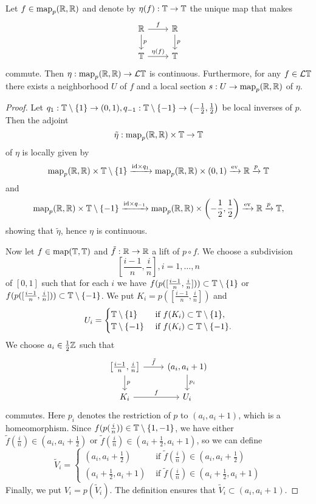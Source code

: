 \begin{prop}\label{prop:loopspacesection}
Let $f\in \mathrm{map}_p(\mathbb{R},\mathbb{R})$ and denote by $\eta(f):\mathbb{T}\to \mathbb{T}$ the unique map
that makes 
$$
\begin{tikzcd}
\RR \arrow{r}{f}\arrow{d}{p}
&\RR\arrow{d}{p}\\
\TT\arrow{r}{\eta(f)}
&\TT
\end{tikzcd}
$$
commute. Then $\eta:\mathrm{map}_p(\mathbb{R},\mathbb{R})\rightarrow \mathcal{L}\mathbb{T}$ is continuous.
Furthermore,  for any $f\in \mathcal{L}\mathbb{T}$ there exists a neighborhood $U$
of $f$ and a local section $s:U\rightarrow \mathrm{map}_p(\mathbb{R},\mathbb{R})$ of $\eta$.
\end{prop}
\begin{proof}
Let $q_1:\mathbb{T}\setminus\{1\}\rightarrow (0,1), q_{-1}:\mathbb{T}\setminus\{-1\}\to \left(-\frac12, \frac12\right)$
be local inverses of $p$. Then the adjoint
$$\tilde \eta:\mathrm{map}_p(\mathbb{R},\mathbb{R})\times \mathbb{T}\to \mathbb{T}$$
of $\eta$ is locally given by
$$\mathrm{map}_p(\mathbb{R},\mathbb{R})\times \mathbb{T}\setminus\{1\}\xrightarrow{\mathrm{id}\times q_1}
\mathrm{map}_p(\mathbb{R},\mathbb{R})\times (0,1)\xrightarrow{\mathrm{ev}}\mathbb{R}
\xrightarrow{p} \mathbb{T}$$
and
$$\mathrm{map}_p(\mathbb{R},\mathbb{R})\times \mathbb{T}\setminus\{-1\}\xrightarrow{\mathrm{id}\times q_{-1}}
\mathrm{map}_p(\mathbb{R},\mathbb{R})\times \left(-\frac12,\frac12\right)\xrightarrow{\mathrm{ev}}\mathbb{R}
\xrightarrow{p} \mathbb{T},$$
showing that $\tilde \eta$, hence $\eta$ is continuous.

Now let $f\in \mathrm{map}(\mathbb{T},\mathbb{T})$ and $\tilde f:\mathbb{R}\to \mathbb{R}$ a lift of $p\circ f$.
We choose a subdivision $$\left[\frac{i-1}{n}, \frac{i}{n}\right], i = 1,\ldots ,n$$ of $[0,1]$
such that for each $i$ we have $f(p([\frac{i-1}{n}, \frac{i}{n}]))\subset \mathbb{T}\setminus\{1\}$ 
or $f(p([\frac{i-1}{n}, \frac{i}{n}]))\subset \mathbb{T}\setminus\{-1\}$. We put $K_i = p([\frac{i-1}{n}, \frac{i}{n}])$
and 
$$U_i = 
\begin{cases}
\mathbb{T}\setminus\{1\} &\text{ if } f(K_i)\subset \mathbb{T}\setminus\{1\},\\
\mathbb{T}\setminus\{-1\} &\text{ if } f(K_i)\subset \mathbb{T}\setminus\{-1\}.
\end{cases}$$
We choose $a_i\in \frac12 \mathbb{Z}$ such that 
$$
\begin{tikzcd}
\left [\frac{i-1}{n}, \frac{i}{n} \right ]
\arrow{r}{\tilde f}
\arrow{d}{p}
&(a_i, a_i+1)\arrow{d}{p_i}\\
K_i\arrow{r}{f}
&U_i
\end{tikzcd}
$$
commutes. Here $p_i$ denotes the restriction of $p$ to $(a_i, a_i+1)$, which is a homeomorphism.
Since $f(p(\frac{i}{n}))\in \mathbb{T}\setminus\{1, -1\}$, we have either
$\tilde f(\frac{i}{n})\in \left(a_i, a_i+\frac12\right)$ or $\tilde f(\frac{i}{n})\in \left(a_i +\frac12, a_i +1\right)$, so we can define
$$\tilde V_i = 
\begin{cases}
 \left(a_i, a_i+\frac12\right) &\text{ if } \tilde f(\frac{i}{n})\in \left(a_i, a_i+\frac12\right)\\
 \left(a_i +\frac12, a_i +1\right) &\text{ if } 
 \tilde f(\frac{i}{n})\in \left(a_i +\frac12, a_i +1\right)
\end{cases}$$
Finally, we put $V_i = p(\tilde V_i)$. The definition ensures that 
$\tilde V_i\subset (a_{i}, a_{i}+1)$.


\end{proof}
